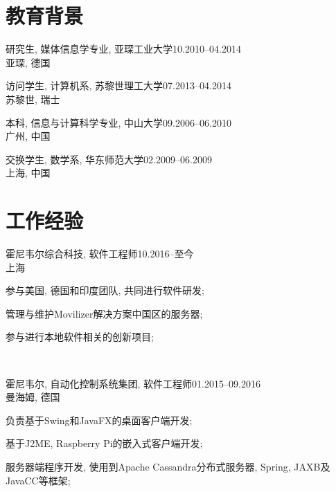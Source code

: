 \documentclass[11pt]{article} %
\begin{document}
\begin{minipage}[t]{0.5\textwidth}
\section{教育背景}
\normalsize{研究生, 媒体信息学专业, 亚琛工业大学\hfill10.2010--04.2014}\\
\small{亚琛, 德国}\\\par
\normalsize{访问学生, 计算机系, 苏黎世理工大学\hfill07.2013--04.2014}\\
\small{苏黎世, 瑞士}\\\par
\normalsize{本科, 信息与计算科学专业, 中山大学\hfill09.2006--06.2010}\\
\small{广州, 中国}\\\par
\normalsize{交换学生, 数学系, 华东师范大学\hfill02.2009--06.2009}\\
\small{上海, 中国}\\\par

\section{工作经验}
\normalsize{霍尼韦尔综合科技, 软件工程师\hfill10.2016--至今\\
\small{上海}\\
\begin{inparaitem}
	\item 参与美国, 德国和印度团队, 共同进行软件研发;
	\newline
	\item 管理与维护Movilizer解决方案中国区的服务器;
	\newline
	\item 参与进行本地软件相关的创新项目;
\end{inparaitem}}
\\\par

\normalsize{霍尼韦尔, 自动化控制系统集团, 软件工程师\hfill01.2015--09.2016\\
\small{曼海姆, 德国}\\
\begin{inparaitem}
	\item 负责基于Swing和JavaFX的桌面客户端开发;
	\newline
	\item 基于J2ME, Raspberry Pi的嵌入式客户端开发;
	\newline
	\item 服务器端程序开发, 使用到Apache Cassandra分布式服务器, Spring, JAXB及JavaCC等框架;
\end{inparaitem}}
\\\par


\end{minipage}
\end{document}

